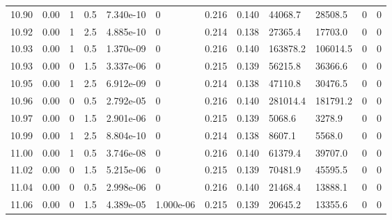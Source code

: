 \documentclass[preview]{standalone}
\begin{document}
{{{{{{{{{{{{{{{{{{{\begin{tabular}{L{1.2cm}C{1.2cm} C{0.3cm}C{0.5cm} C{1.4cm}C{1.4cm} C{1.4cm}C{1.4cm} C{1.6cm}C{1.6cm} C{1.6cm}C{1.6cm}}
  10.90  &  0.00  & 1     & 0.5 &  7.340e-10  & 0  &  0.216&   0.140& 44068.7 & 28508.5   &  0 & 0  \\ 
  10.92  &  0.00  & 1     & 2.5 &  4.885e-10  & 0  &  0.214&   0.138& 27365.4 & 17703.0   &  0 & 0  \\ 
  10.93  &  0.00  & 1     & 0.5 &  1.370e-09  & 0  &  0.216&   0.140& 163878.2 & 106014.5   &  0 & 0  \\ 
  10.93  &  0.00  & 0     & 1.5 &  3.337e-06  & 0  &  0.215&   0.139& 56215.8 & 36366.6   &  0 & 0  \\ 
  10.95  &  0.00  & 1     & 2.5 &  6.912e-09  & 0  &  0.214&   0.138& 47110.8 & 30476.5   &  0 & 0  \\ 
  10.96  &  0.00  & 0     & 0.5 &  2.792e-05  & 0  &  0.216&   0.140& 281014.4 & 181791.2   &  0 & 0  \\ 
  10.97  &  0.00  & 0     & 1.5 &  2.901e-06  & 0  &  0.215&   0.139& 5068.6 & 3278.9   &  0 & 0  \\ 
  10.99  &  0.00  & 1     & 2.5 &  8.804e-10  & 0  &  0.214&   0.138& 8607.1 & 5568.0   &  0 & 0  \\ 
  11.00  &  0.00  & 1     & 0.5 &  3.746e-08  & 0  &  0.216&   0.140& 61379.4 & 39707.0   &  0 & 0  \\ 
  11.02  &  0.00  & 0     & 1.5 &  5.215e-06  & 0  &  0.215&   0.139& 70481.9 & 45595.5   &  0 & 0  \\ 
  11.04  &  0.00  & 0     & 0.5 &  2.998e-06  & 0  &  0.216&   0.140& 21468.4 & 13888.1   &  0 & 0  \\ 
  11.06  &  0.00  & 0     & 1.5 &  4.389e-05  & 1.000e-06  &  0.215&   0.139& 20645.2 & 13355.6   &  0 & 0  \\ 
\hline 
\end{tabular} 

}}}}}}}}}}}}}}}}}}}
\end{document}
